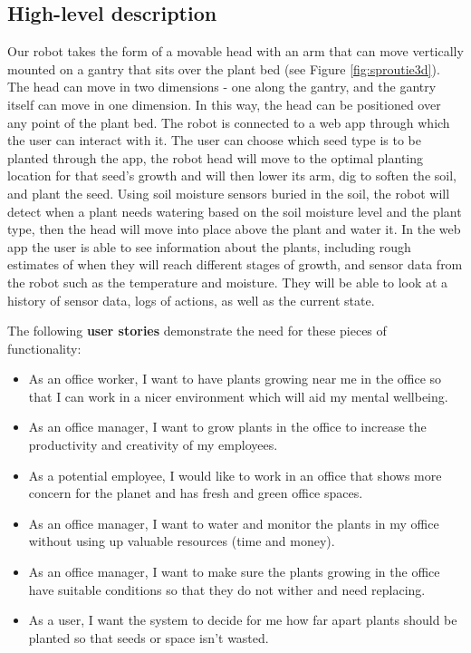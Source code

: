 \documentclass{article}
\begin{document}
\subsection{High-level description} 
Our robot takes the form of a movable head with an arm that can move vertically mounted on a gantry that sits over the plant bed (see Figure \ref{fig:sproutie3d}). The head can move in two dimensions - one along the gantry, and the gantry itself can move in one dimension. In this way, the head can be positioned over any point of the plant bed. The robot is connected to a web app through which the user can interact with it. The user can choose which seed type is to be planted through the app, the robot head will move to the optimal planting location for that seed's growth and will then lower its arm, dig to soften the soil, and plant the seed. Using soil moisture sensors buried in the soil, the robot will detect when a plant needs watering based on the soil moisture level and the plant type, then the head will move into place above the plant and water it. In the web app the user is able to see information about the plants, including rough estimates of when they will reach different stages of growth, and sensor data from the robot such as the temperature and moisture. They will be able to look at a history of sensor data, logs of actions, as well as the current state.

The following \textbf{user stories} demonstrate the need for these pieces of functionality:
\begin{itemize}
    \item As an office worker, I want to have plants growing near me in the office so that I can work in a nicer environment which will aid my mental wellbeing.
\item As an office manager, I want to grow plants in the office to increase the productivity and creativity of my employees.
\item As a potential employee, I would like to work in an office that shows more concern for the planet and has fresh and green office spaces.
\item As an office manager, I want to water and monitor the plants in my office without using up valuable resources (time and money).
\item As an office manager, I want to make sure the plants growing in the office have suitable conditions so that they do not wither and need replacing.
\item As a user, I want the system to decide for me how far apart plants should be planted so that seeds or space isn't wasted.
\end{itemize}
\end{document}
